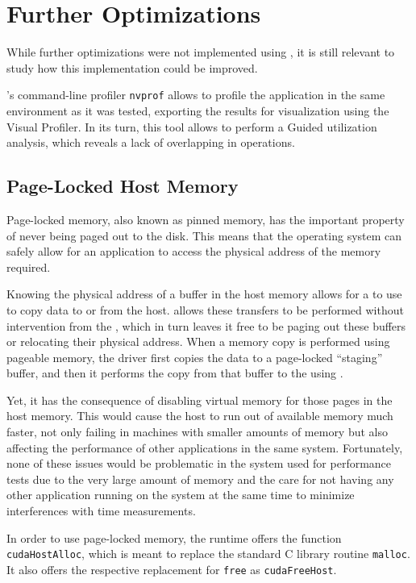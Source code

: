 \documentclass[../thesis]{subfiles}
\begin{document}
	\section{Further Optimizations}
	\label{sec:cuda:further}

	While further optimizations were not implemented using \cuda, it is still relevant to study how this implementation could be improved.

	\nvidia's command-line profiler \texttt{nvprof} allows to profile the application in the same environment as it was tested, exporting the results for visualization using the Visual Profiler. In its turn, this tool allows to perform a Guided \gpu utilization analysis, which reveals a lack of overlapping in operations.

	\subsection{Page-Locked Host Memory}
	Page-locked memory, also known as pinned memory, has the important property of never being paged out to the disk. This means that the operating system can safely allow for an application to access the physical address of the memory required.

	Knowing the physical address of a buffer in the host memory allows for a \gpu to use \dma to copy data to or from the host. \dma allows these transfers to be performed without intervention from the \cpu, which in turn leaves it free to be paging out these buffers or relocating their physical address. When a memory copy is performed using pageable memory, the \cuda driver first copies the data to a page-locked ``staging'' buffer, and then it performs the copy from that buffer to the \gpu using \dma \cite{CbE:2011}.

	Yet, it has the consequence of disabling virtual memory for those pages in the host memory. This would cause the host to run out of available memory much faster, not only failing in machines with smaller amounts of memory but also affecting the performance of other applications in the same system. Fortunately, none of these issues would be problematic in the system used for performance tests due to the very large amount of memory and the care for not having any other application running on the system at the same time to minimize interferences with time measurements.

	In order to use page-locked memory, the \cuda runtime offers the function \texttt{cudaHostAlloc}, which is meant to replace the standard C library routine \texttt{malloc}. It also offers the respective replacement for \texttt{free} as \texttt{cudaFreeHost}.
\end{document}
